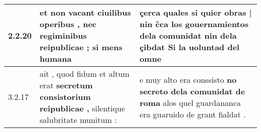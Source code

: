\begin{tabular}{|p{1cm}|p{6.5cm}|p{6.5cm}|}
2.2.20 & et non vacant ciuilibus operibus , \textbf{ nec regiminibus reipublicae ; } si mens humana & çerca \textbf{ quales si quier obras | nin c̃ca los gouernamientos dela comunidat nin dela çibdat } Si la uoluntad del omne \\\hline
3.2.17 & ait , quod fidum et altum erat \textbf{ secretum consistorium reipublicae , } silentique salubritate munitum : & e muy alto era conssisto \textbf{ no secreto dela comunidat de roma } alos quel guardananca era guaruido de grant fialdat . \\\hline

\end{tabular}
